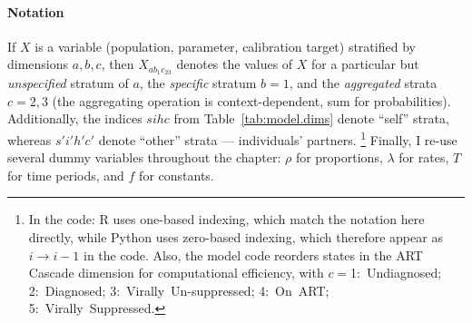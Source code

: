 \paragraph{Notation}
If $X$ is a variable (\eg population, parameter, calibration target)
stratified by dimensions $a,b,c$,
then $X_{ab_{1}c_{23}}$ denotes the values of $X$ for
a particular but \emph{unspecified} stratum of $a$,
the \emph{specific} stratum $b = 1$,
and the \emph{aggregated} strata $c = 2,3$
(the aggregating operation is context-dependent, \eg sum for probabilities).
Additionally, the indices $sihc$ from Table~\ref{tab:model.dims} denote ``self'' strata,
whereas $s'i'h'c'$ denote ``other'' strata --- \ie individuals' partners.%
\footnote{\label{foot:code.note}%
  In the code: R uses one-based indexing, which match the notation here directly,
  while Python uses zero-based indexing, which therefore appear as $i \rightarrow i-1$ in the code.
  Also, the model code reorders states in the ART Cascade dimension for computational efficiency,
  with $c={}$1:~Undiagnosed; 2:~Diagnosed; 3:~Virally~Un-suppressed; 4:~On~ART; 5:~Virally~Suppressed.}
Finally, I re-use several dummy variables throughout the chapter:
$\rho$ for proportions, $\lambda$ for rates, $T$ for time periods, and $f$ for constants.
